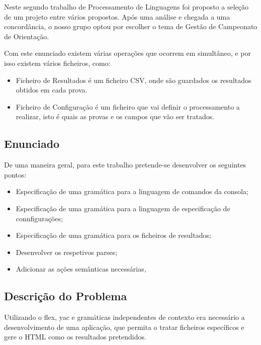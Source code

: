\documentclass[11pt, a4paper, oneside]{article}
\begin{document}
Neste segundo trabalho de Processamento de Linguagens foi proposto a seleção de um projeto entre vários propostos. Após uma análise e chegada a uma concordância, o nosso grupo optou por escolher o tema de Gestão de Campeonato de Orientação.

Com este enunciado existem várias operações que ocorrem em simultâneo, e por isso existem vários ficheiros, como:
\begin{itemize}
\item Ficheiro de Resultados é um ficheiro CSV, onde são guardados os resultados obtidos em cada prova.

\item Ficheiro de Configuração é um ficheiro que vai definir o processamento a realizar, isto é quais as provas e os campos que vão ser tratados.
\end{itemize}

\subsection{Enunciado}

De uma maneira geral, para este trabalho pretende-se desenvolver os seguintes pontos:

\begin{itemize}
\item Especificação de uma gramática para a linguagem de comandos da consola;
\item Especificação de uma gramática para a linguagem de especificação de connfigurações;
\item Especificação de uma gramática para os ficheiros de resultados;
\item Desenvolver os respetivos parses;
\item Adicionar as ações semânticas necessárias,
\end{itemize}

\subsection{Descrição do Problema}

Utilizando o flex, yac e gramáticas independentes de contexto era necessário a desenvolvimento de uma aplicação, que permita o tratar ficheiros específicos e gere o HTML como os resultados pretendidos.
\end{document}
